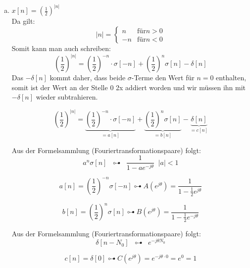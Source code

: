 \begin{uebsp}
\begin{Answer}
\begin{enumerate}[a)]
                \newpage
        \item $\displaystyle
            x[n]=\left(\frac{1}{2}\right)^{|n|}$\label{item:hochn}\\
            Da gilt: 
            \[|n|=\begin{cases}n&\text{für} n>0\\-n&\text{für} n<0\end{cases}\] 
            Somit kann man auch schreiben:
            \[\left(\frac{1}{2}\right)^{|n|}=\left(\frac{1}{2}\right)^{-n}\cdot
            \sigma[-n]+\left(\frac{1}{2}\right)^{n}\sigma[n]-\delta[n]\]
            Das $-\delta[n]$ kommt daher, dass beide $\sigma$-Terme den Wert für
            $n=0$ enthalten, somit ist der Wert an der Stelle 0 2x addiert
            worden und wir müssen ihn mit $-\delta[n]$ wieder subtrahieren.

            \[\left(\frac{1}{2}\right)^{|n|}=\underbrace{\left(\frac{1}{2}\right)^{-n}\cdot
                \sigma[-n]}_{=a[n]}+\underbrace{\left(\frac{1}{2}\right)^{n}\sigma[n]}_{=b[n]}
                    -\underbrace{\delta[n]}_{=c[n]}\]
            \begin{uebsp_theory}
                Aus der Formelsammlung (Fouriertransformationspaare) folgt:
                \[a^n\sigma[n]\;\;\multimapdotbothA\;\;\frac{1}{1-ae^{-j\theta}}\;\;|a|<1\]
            \end{uebsp_theory}
            \[a[n]=\left(\frac{1}{2}\right)^{-n}\sigma[-n]\multimapdotbothA
            A\left(e^{j\theta}\right)=\frac{1}{1-\frac{1}{2}e^{j\theta}}\]

            \[b[n]=\left(\frac{1}{2}\right)^{n}\sigma[n]\multimapdotbothA
            B\left(e^{j\theta}\right)=\frac{1}{1-\frac{1}{2}e^{-j\theta}}\]

            \begin{uebsp_theory}
                Aus der Formelsammlung (Fouriertransformationspaare) folgt:
                \[\delta[n-N_0]\;\;\multimapdotbothA\;\;e^{-j\theta N_0}\]
            \end{uebsp_theory}
            \[c[n]=\delta[0]\multimapdotbothA
            C\left(e^{j\theta}\right)=e^{-j\theta\cdot 0}=e^0=1\]


\end{enumerate}
\end{Answer}
\end{uebsp}
